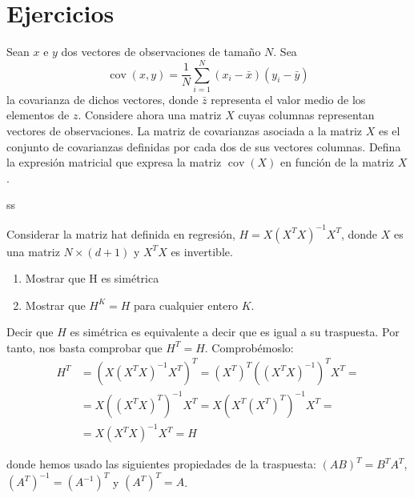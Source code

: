 \documentclass[a4paper, 11pt]{article}
\begin{document}
    \maketitle

    \section{Ejercicios}


      \begin{ejercicio}
        Sean $x$ e $y$ dos vectores de observaciones de tamaño $N$. Sea
        \[
        \operatorname{cov}(x,y)=\frac{1}{N}\sum_{i=1}^N (x_i-\bar{x})(y_i-\bar{y})
        \]
        la covarianza de dichos vectores, donde $\bar{z}$ representa el valor medio de los elementos de $z$. Considere ahora una matriz $X$ cuyas columnas representan vectores de observaciones. La matriz de covarianzas asociada a la matriz $X$ es el conjunto de covarianzas definidas por cada dos de sus vectores columnas. Defina la expresión matricial que expresa la matriz $\operatorname{cov}(X)$ en función de la matriz $X$.
      \end{ejercicio}

      \begin{solucion}
        ss
      \end{solucion}

      \begin{ejercicio}
        Considerar la matriz hat definida en regresión,  $H = X(X^TX)^{-1}X^T$, donde $X$ es una matriz  $N \times (d+1)$ y $X^TX$ es invertible.
        \begin{enumerate}
            \item Mostrar que H es simétrica
            \item Mostrar que $H^K=H$ para cualquier entero $K$.
        \end{enumerate}
      \end{ejercicio}

      \begin{solucion}
          Decir que $H$ es simétrica es equivalente a decir que es igual a su traspuesta. Por tanto, nos basta comprobar que $H^T = H$. Comprobémoslo:
          \begin{align*}
              H^T &= \left(X \left(X^TX\right)^{-1} X^T\right)^T = (X^T)^T \left(\left(X^TX\right)^{-1}\right)^T X^T = \\
              &= X \left(\left(X^TX\right)^T\right)^{-1} X^T = X \left(X^T \left(X^T\right)^T\right)^{-1} X^T = \\
              &= X (X^T X)^{-1} X^T = H
          \end{align*}
      \end{solucion}
      donde hemos usado las siguientes propiedades de la traspuesta: $(AB)^T = B^T A^T$, $(A^T)^{-1} = (A^{-1})^T$ y $(A^T)^T = A$.
\end{document}
